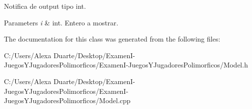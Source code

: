 Notifica de output tipo int. 


\begin{DoxyParams}{Parameters}
{\em i} & int. Entero a mostrar. \\
\hline
\end{DoxyParams}


The documentation for this class was generated from the following files\+:\begin{DoxyCompactItemize}
\item 
C\+:/\+Users/\+Alexa Duarte/\+Desktop/\+Examen\+I-\/\+Juegos\+Y\+Jugadores\+Polimorficos/\+Examen\+I-\/\+Juegos\+Y\+Jugadores\+Polimorficos/Model.\+h\item 
C\+:/\+Users/\+Alexa Duarte/\+Desktop/\+Examen\+I-\/\+Juegos\+Y\+Jugadores\+Polimorficos/\+Examen\+I-\/\+Juegos\+Y\+Jugadores\+Polimorficos/Model.\+cpp\end{DoxyCompactItemize}
